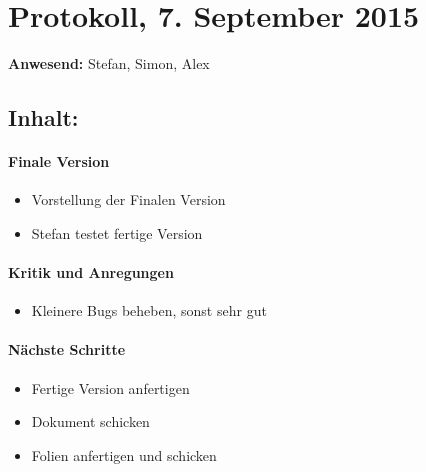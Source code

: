 \documentclass[a4paper,11pt]{article}
\begin{document}
\section*{Protokoll, 7. September 2015}

\textbf{Anwesend:} Stefan, Simon, Alex

\subsection*{Inhalt:}

\paragraph{Finale Version}
\begin{itemize}
  \item Vorstellung der Finalen Version
  \item Stefan testet fertige Version
\end{itemize}
\paragraph{Kritik und Anregungen}
\begin{itemize}
  \item Kleinere Bugs beheben, sonst sehr gut
\end{itemize}

\paragraph{Nächste Schritte}
\begin{itemize}
  \item Fertige Version anfertigen 
  \item Dokument schicken
  \item Folien anfertigen und schicken
\end{itemize}
\end{document}
